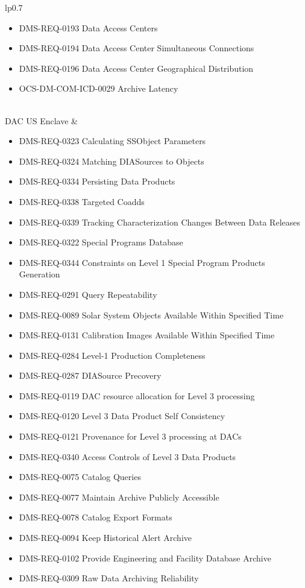 \begin{xtabular}{lp{0.7\textwidth}}
\begin{itemize}
\item DMS-REQ-0193 Data Access Centers
\item DMS-REQ-0194 Data Access Center Simultaneous Connections
\item DMS-REQ-0196 Data Access Center Geographical Distribution
\item OCS-DM-COM-ICD-0029 Archive Latency
\end{itemize} \\ \hline
DAC US Enclave &
\begin{itemize}DMS-REQ-0004 Nightly Data Accessible Within 24 hrs
\item DMS-REQ-0323 Calculating SSObject Parameters
\item DMS-REQ-0324 Matching DIASources to Objects
\item DMS-REQ-0334 Persisting Data Products
\item DMS-REQ-0338 Targeted Coadds
\item DMS-REQ-0339 Tracking Characterization Changes Between Data Releases
\item DMS-REQ-0322 Special Programs Database
\item DMS-REQ-0344 Constraints on Level 1 Special Program Products Generation
\item DMS-REQ-0291 Query Repeatability
\item DMS-REQ-0089 Solar System Objects Available Within Specified Time
\item DMS-REQ-0131 Calibration Images Available Within Specified Time
\item DMS-REQ-0284 Level-1 Production Completeness
\item DMS-REQ-0287 DIASource Precovery
\item DMS-REQ-0119 DAC resource allocation for Level 3 processing
\item DMS-REQ-0120 Level 3 Data Product Self Consistency
\item DMS-REQ-0121 Provenance for Level 3 processing at DACs
\item DMS-REQ-0340 Access Controls of Level 3 Data Products
\item DMS-REQ-0075 Catalog Queries
\item DMS-REQ-0077 Maintain Archive Publicly Accessible
\item DMS-REQ-0078 Catalog Export Formats
\item DMS-REQ-0094 Keep Historical Alert Archive
\item DMS-REQ-0102 Provide Engineering and Facility Database Archive
\item DMS-REQ-0309 Raw Data Archiving Reliability

\end{itemize}
\end{xtabular}
